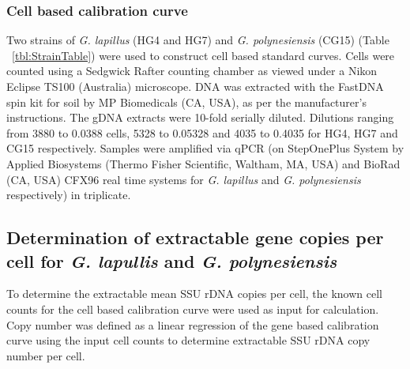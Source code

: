 \documentclass[12pt]{article}
\begin{document}
\subsubsection*{Cell based calibration curve}
Two strains of \emph{G. lapillus} (HG4 and HG7) and \emph{G. polynesiensis} (CG15) (Table ~\ref{tbl:StrainTable}) were used to construct cell based standard curves. Cells were counted using a Sedgwick Rafter counting chamber as viewed under a Nikon Eclipse TS100 (Australia) microscope. DNA was extracted with the FastDNA spin kit for soil by MP Biomedicals (CA, USA), as per the manufacturer's instructions. The gDNA extracts were 10-fold serially diluted. Dilutions ranging from 3880 to 0.0388 cells, 5328 to 0.05328 and 4035 to 0.4035 for HG4, HG7 and CG15 respectively. Samples were amplified via qPCR (on StepOnePlus System by Applied Biosystems (Thermo Fisher Scientific, Waltham, MA, USA) and BioRad (CA, USA) CFX96 real time systems for \emph{G. lapillus} and \emph{G. polynesiensis} respectively) in triplicate.

\subsection*{Determination of extractable gene copies per cell for \emph{G. lapullis} and \emph{G. polynesiensis}}

To determine the extractable mean SSU rDNA copies per cell, the known cell counts for the cell based calibration curve were used as input for calculation. Copy number was defined as a linear regression of the gene based calibration curve using the input cell counts to determine extractable SSU rDNA copy number per cell.
\end{document}
